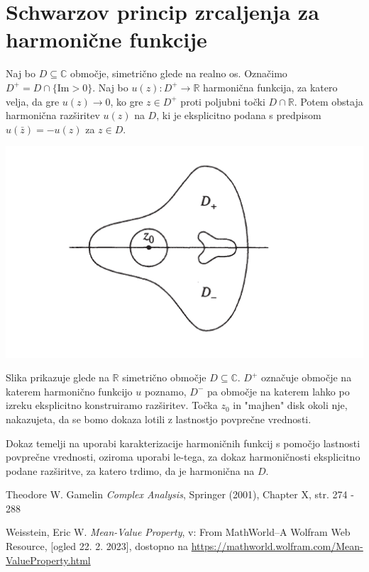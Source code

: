 \documentclass[mat1]{fmfdelo}
\newcommand{\R}{\mathbb R}
\newcommand{\C}{\mathbb C}
\begin{document}
\section{Schwarzov princip zrcaljenja za harmonične funkcije}
    \begin{izrek}
        Naj bo $D \subseteq \C$ območje, simetrično glede na realno os. 
        Označimo $D^{+} = D \cap \{\text{Im} > 0\}$. 
        Naj bo $u(z): D^{+} \to \mathbb{R}$ harmonična funkcija, za katero velja, da gre $u(z) \to 0$, ko gre $z \in D^{+}$ proti poljubni točki $D \cap \mathbb{R}$. 
        Potem obstaja harmonična razširitev $u(z)$ na $D$, ki je eksplicitno podana s predpisom $u(\bar{z}) = - u(z)$ za $z \in D$.
    \end{izrek}
    \begin{center}
        \includegraphics[width = 0.8 \textwidth]{schwarzov_princip_zrcaljenja.png}
    \end{center}
    Slika prikazuje glede na $\R$ simetrično območje $D \subseteq \C$. $D^{+}$ označuje  območje na katerem harmonično funkcijo $u$ poznamo, $D^{-}$ pa območje na katerem lahko po izreku eksplicitno konstruiramo razširitev.
    Točka $z_0$ in "majhen" disk okoli nje, nakazujeta, da se bomo dokaza lotili z lastnostjo povprečne vrednosti.
    \begin{dokaz}
        Dokaz temelji na uporabi karakterizacije harmoničnih funkcij s pomočjo lastnosti povprečne vrednosti, oziroma uporabi le-tega, za dokaz harmoničnosti eksplicitno podane razširitve, za katero trdimo, da je harmonična na $D$.
    \end{dokaz}

\newpage


\begin{thebibliography}{9}
    Theodore W. Gamelin \emph{Complex Analysis}, Springer (2001), Chapter X, str. 274 - 288

    Weisstein, Eric W. \emph{Mean-Value Property}, v: From MathWorld--A Wolfram Web Resource, [ogled 22. 2. 2023], dostopno na \href{https://mathworld.wolfram.com/Mean-ValueProperty.html}{https://mathworld.wolfram.com/Mean-ValueProperty.html}
\end{thebibliography}
\end{document}
